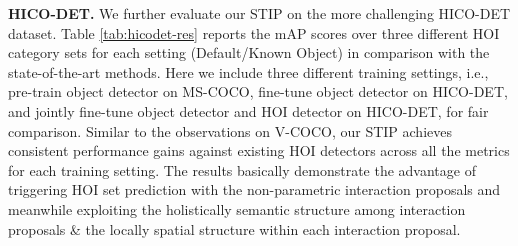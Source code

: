 \documentclass[10pt,twocolumn,letterpaper]{article}
\begin{document}
\begin{table}[!tb]
\begin{center}
\end{center}
\vspace{-0.22in}
\caption{Performance contribution of each component in our STIP. \textbf{HM}: Hard Mining strategy for training interaction proposal network. \textbf{TR}: vanilla TRansformer. \textbf{TR\textsuperscript{\emph{SS}}}: TRansformer with only Structure-aware Self-attention that exploits inter-interaction structure. \textbf{TR\textsuperscript{\emph{SC}}}: TRansformer with only Structure-aware Cross-attention that exploits intra-interaction structure.}
\label{tab:main-ablation}
\vspace{-0.25in}
\end{table}

\textbf{HICO-DET.} We further evaluate our STIP on the more challenging HICO-DET dataset. Table \ref{tab:hicodet-res} reports the mAP scores over three different HOI category sets for each setting (Default/Known Object) in comparison with the state-of-the-art methods. Here we include three different training settings, i.e., pre-train object detector on MS-COCO, fine-tune object detector on HICO-DET, and jointly fine-tune object detector and HOI detector on HICO-DET, for fair comparison. Similar to the observations on V-COCO, our STIP achieves consistent performance gains against existing HOI detectors across all the metrics for each training setting. The results basically demonstrate the advantage of triggering HOI set prediction with the non-parametric interaction proposals and meanwhile exploiting the holistically semantic structure among interaction proposals \& the locally spatial structure within each interaction proposal.
\end{document}
